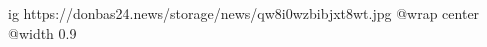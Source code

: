  
 
 
 
 

\ifcmt
  ig https://donbas24.news/storage/news/qw8i0wzbibjxt8wt.jpg
  @wrap center
  @width 0.9
\fi
